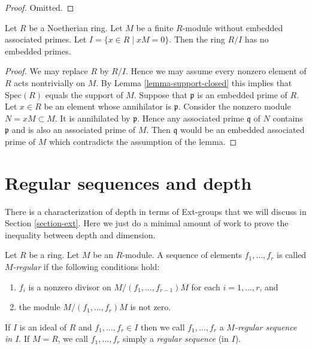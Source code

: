 \begin{proof}
Omitted.
\end{proof}

\begin{lemma}
\label{lemma-no-embedded-primes-endos}
Let $R$ be a Noetherian ring.
Let $M$ be a finite $R$-module without embedded associated primes.
Let $I = \{x \in R \mid xM = 0\}$. Then the ring $R/I$ has no
embedded primes.
\end{lemma}

\begin{proof}
We may replace $R$ by $R/I$.
Hence we may assume every nonzero element
of $R$ acts nontrivially on $M$.
By Lemma \ref{lemma-support-closed} this implies that
$\text{Spec}(R)$ equals the support of $M$.
Suppose that $\mathfrak p$ is an embedded prime of $R$.
Let $x \in R$ be an element whose annihilator is $\mathfrak p$.
Consider the nonzero module $N = xM \subset M$. It is annihilated
by $\mathfrak p$. Hence any associated prime $\mathfrak q$ of $N$
contains $\mathfrak p$ and is also an associated prime of $M$.
Then $\mathfrak q$ would be an embedded associated prime of
$M$ which contradicts the assumption of the lemma.
\end{proof}

















\section{Regular sequences and depth}
\label{section-depth}

\noindent
There is a characterization of depth in terms of Ext-groups
that we will discuss in Section \ref{section-ext}. Here we just do
a minimal amount of work to prove the inequality between
depth and dimension.

\begin{definition}
\label{definition-regular-sequence}
Let $R$ be a ring.
Let $M$ be an $R$-module.
A sequence of elements $f_1, \ldots, f_r$ is called {\it $M$-regular}
if the following conditions hold:
\begin{enumerate}
\item $f_i$ is a nonzero divisor on
$M/(f_1, \ldots, f_{r-1})M$
for each $i = 1, \ldots, r$, and
\item the module $M/(f_1, \ldots, f_r)M$ is not zero.
\end{enumerate}
If $I$ is an ideal of $R$ and $f_1, \ldots, f_r \in I$
then we call $f_1, \ldots, f_r$ a {\it $M$-regular sequence
in $I$}. If $M = R$, we call $f_1, \ldots, f_r$ simply a
{\it regular sequence} (in $I$).
\end{definition}

